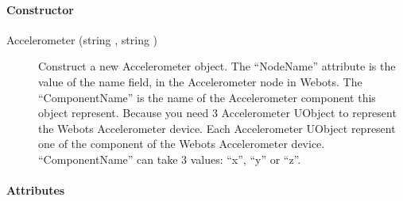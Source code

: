 \paragraph{Constructor}
\label{webots.uobjects.robotdevices.accelerometer.constructor}%

\noindent
\begin{description}
\item[{Accelerometer (string , string
    )}] Construct a new Accelerometer object.  The
  ``NodeName'' attribute is the value of the name field, in the
  Accelerometer node in Webots.  The ``ComponentName'' is the name of
  the Accelerometer component this object represent.  Because you need
  3 Accelerometer UObject to represent the Webots Accelerometer
  device. Each Accelerometer UObject represent one of the component of
  the Webots Accelerometer device.  ``ComponentName'' can take 3
  values: ``x'', ``y'' or ``z''.

\end{description}

\paragraph{Attributes}
\label{webots.uobjects.robotdevices.accelerometer.attributes}%

\newenvironment{attribute}[4]
{
  \item \lstinline|#1|\\
    \begin{description}
    \item[Permissions] #2.
    \item[Type] #3.
    \item[Range] #4.
    \item[Description]
}{
    \end{description}
}

